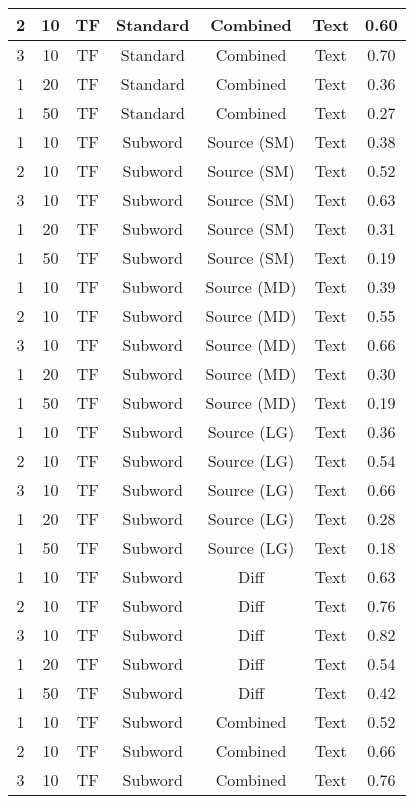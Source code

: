 \begin{longtable}{|c|c|c|c|c|c|c|}
\hline
2 & 10 & TF & Standard & Combined & Text & 0.60 \\
\hline
3 & 10 & TF & Standard & Combined & Text & 0.70 \\
\hline
1 & 20 & TF & Standard & Combined & Text & 0.36 \\
\hline
1 & 50 & TF & Standard & Combined & Text & 0.27 \\
\hline
1 & 10 & TF & Subword & Source (SM) & Text & 0.38 \\
\hline
2 & 10 & TF & Subword & Source (SM) & Text & 0.52 \\
\hline
3 & 10 & TF & Subword & Source (SM) & Text & 0.63 \\
\hline
1 & 20 & TF & Subword & Source (SM) & Text & 0.31 \\
\hline
1 & 50 & TF & Subword & Source (SM) & Text & 0.19 \\
\hline
1 & 10 & TF & Subword & Source (MD) & Text & 0.39 \\
\hline
2 & 10 & TF & Subword & Source (MD) & Text & 0.55 \\
\hline
3 & 10 & TF & Subword & Source (MD) & Text & 0.66 \\
\hline
1 & 20 & TF & Subword & Source (MD) & Text & 0.30 \\
\hline
1 & 50 & TF & Subword & Source (MD) & Text & 0.19 \\
\hline
1 & 10 & TF & Subword & Source (LG) & Text & 0.36 \\
\hline
2 & 10 & TF & Subword & Source (LG) & Text & 0.54 \\
\hline
3 & 10 & TF & Subword & Source (LG) & Text & 0.66 \\
\hline
1 & 20 & TF & Subword & Source (LG) & Text & 0.28 \\
\hline
1 & 50 & TF & Subword & Source (LG) & Text & 0.18 \\
\hline
1 & 10 & TF & Subword & Diff & Text & 0.63 \\
\hline
2 & 10 & TF & Subword & Diff & Text & 0.76 \\
\hline
3 & 10 & TF & Subword & Diff & Text & 0.82 \\
\hline
1 & 20 & TF & Subword & Diff & Text & 0.54 \\
\hline
1 & 50 & TF & Subword & Diff & Text & 0.42 \\
\hline
1 & 10 & TF & Subword & Combined & Text & 0.52 \\
\hline
2 & 10 & TF & Subword & Combined & Text & 0.66 \\
\hline
3 & 10 & TF & Subword & Combined & Text & 0.76 \\

\end{longtable}
